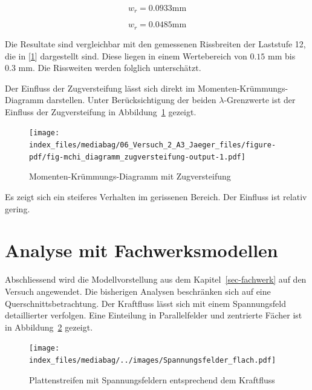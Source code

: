 \documentclass[
  12pt,
  letterpaper,
  egregdoesnotlikesansseriftitles]{scrreprt}
\begin{document}
\begin{equation}w_{r} = 0.0933 \text{mm}\end{equation}

\begin{equation}w_{r} = 0.0485 \text{mm}\end{equation}

Die Resultate sind vergleichbar mit den gemessenen Rissbreiten der
Laststufe 12, die in {[}\protect\hyperlink{ref-Jaeger2006}{1}{]}
dargestellt sind. Diese liegen in einem Wertebereich von
\(0.15 \text{ mm}\) bis \(0.3 \text{ mm}\). Die Rissweiten werden
folglich unterschätzt.

Der Einfluss der Zugversteifung lässt sich direkt im
Momenten-Krümmungs-Diagramm darstellen. Unter Berücksichtigung der
beiden \(\lambda\)-Grenzwerte ist der Einfluss der Zugversteifung in
Abbildung~\ref{fig-mchi_diagramm_zugversteifung} gezeigt.

\begin{figure}[H]

{\centering \texttt{[image: index\_files/mediabag/06\_Versuch\_2\_A3\_Jaeger\_files/figure-pdf/fig-mchi\_diagramm\_zugversteifung-output-1.pdf]}

}

\caption{\label{fig-mchi_diagramm_zugversteifung}Momenten-Krümmungs-Diagramm
mit Zugversteifung}

\end{figure}

Es zeigt sich ein steiferes Verhalten im gerissenen Bereich. Der
Einfluss ist relativ gering.

\hypertarget{analyse-mit-fachwerksmodellen}{%
\section{Analyse mit
Fachwerksmodellen}\label{analyse-mit-fachwerksmodellen}}

Abschliessend wird die Modellvorstellung aus dem
Kapitel~\ref{sec-fachwerk} auf den Versuch angewendet. Die bisherigen
Analysen beschränken sich auf eine Querschnittsbetrachtung. Der
Kraftfluss lässt sich mit einem Spannungsfeld detaillierter verfolgen.
Eine Einteilung in Parallelfelder und zentrierte Fächer ist in
Abbildung~\ref{fig-spannungsfelder_flach} gezeigt.

\begin{figure}[H]

{\centering \texttt{[image: index\_files/mediabag/../images/Spannungsfelder\_flach.pdf]}

}

\caption{\label{fig-spannungsfelder_flach}Plattenstreifen mit
Spannungsfeldern entsprechend dem Kraftfluss}

\end{figure}
\end{document}
